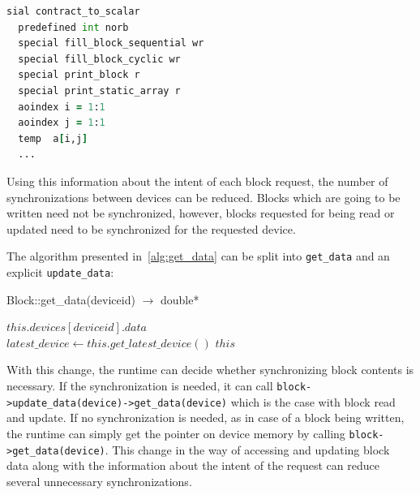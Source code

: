 \begin{lstlisting}[caption={SIAL fragment showing user defined super instruction attributes},
  language=Fortran,
  label={lst:userdefinedsuperinstructionattr}]
sial contract_to_scalar
  predefined int norb
  special fill_block_sequential wr
  special fill_block_cyclic wr
  special print_block r
  special print_static_array r
  aoindex i = 1:1
  aoindex j = 1:1
  temp  a[i,j]
  ...
\end{lstlisting}

Using this information about the intent of each block request, the
number of synchronizations between devices can be reduced. Blocks which are
going to be written need not be synchronized, however, blocks requested for
being read or updated need to be synchronized for the requested device.

The algorithm presented in~\ref{alg:get_data} can be split into
\texttt{get\_data} and an explicit \texttt{update\_data}:

\begin{algorithm}  {Block::get\_data(deviceid) $\rightarrow$ double*}
  \singlespacing

  \begin{algorithmic}[1]
    \State \Return $this.devices[deviceid].data$
    \EndFunction
    \\
    \State $latest\_device \gets this.get\_latest\_device()$
    \EndIf
    \State \Return $this$
    \EndFunction
  \end{algorithmic}
\end{algorithm}

With this change, the runtime can decide whether synchronizing block contents
is necessary. If the synchronization is needed, it can call
\texttt{block\-->update\_data(device)\-->get\_data(device)}
which is the case with block read and update. If no synchronization is needed, as in case
of a block being written, the runtime can simply get the pointer on device memory by calling
\texttt{block->get\_data(device)}.
This change in the way of accessing and updating block data along with the information
about the intent of the request can reduce several unnecessary synchronizations.

